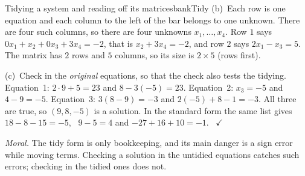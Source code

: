 \documentclass[11pt]{article}
\begin{document}
\begin{exmp}{Tidying a system and reading off its matrices}{bankTidy}
(b)~Each row is one equation and each column to the left of the bar belongs to one unknown. There are four such columns, so there are four unknowns $x_1,\dots,x_4$. Row $1$ says $0x_1+x_2+0x_3+3x_4=-2$, that is $x_2+3x_4=-2$, and row $2$ says $2x_1-x_3=5$. The matrix has $2$ rows and $5$ columns, so its size is $2\times5$ (rows first).

(c)~Check in the \emph{original} equations, so that the check also tests the tidying. Equation~1: $2\cdot9+5=23$ and $8-3(-5)=23$. Equation~2: $x_3=-5$ and $4-9=-5$. Equation~3: $3(8-9)=-3$ and $2(-5)+8-1=-3$. All three are true, so $(9,8,-5)$ is a solution. In the standard form the same list gives $18-8-15=-5$, \ $9-5=4$ and $-27+16+10=-1$. \ $\checkmark$

\emph{Moral.} The tidy form is only bookkeeping, and its main danger is a sign error while moving terms. Checking a solution in the untidied equations catches such errors; checking in the tidied ones does not.
\end{exmp}
\end{document}
